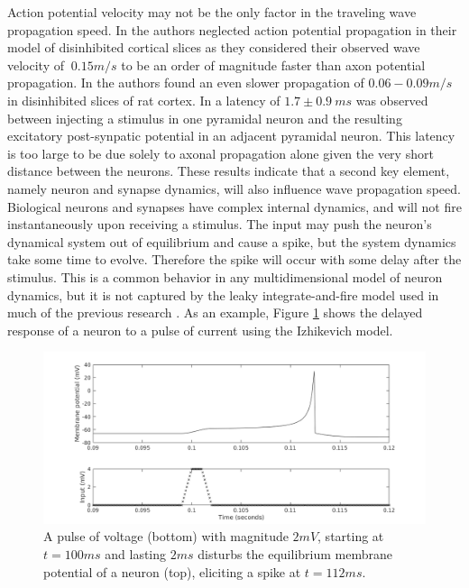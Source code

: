 Action potential velocity may not be the only factor in the traveling wave propagation speed.
In \citet{Golomb1997} the authors neglected action potential propagation in their model of disinhibited cortical slices as they considered their observed wave velocity of $~0.15 m/s$ to be an order of magnitude faster than axon potential propagation.
In \citet{Chervin1988} the authors found an even slower propagation of $0.06-0.09 m/s$ in disinhibited slices of rat cortex.
In  \citet{Markram1997} a latency of $1.7\pm 0.9\ ms$ was observed between injecting a stimulus in one pyramidal neuron and the resulting excitatory post-synpatic potential in an adjacent pyramidal neuron.
This latency is too large to be due solely to axonal propagation alone given the very short distance between the neurons. 
These results indicate that a second key element, namely neuron and synapse dynamics, will also influence wave propagation speed.
Biological neurons and synapses  have complex internal dynamics, and will not fire instantaneously upon receiving a stimulus.
The input may push the neuron's dynamical system out of equilibrium and cause a spike, but the system dynamics take some time to evolve.
Therefore the spike will occur with some delay after the stimulus.
This is a common behavior in any multidimensional model of neuron dynamics, but it is not captured by the leaky integrate-and-fire model used in much of the previous research \citet{keane2015}\citet{Senk2020}.
As an example, Figure \ref{fig:delay_neuronstep} shows the delayed response of a neuron to a pulse of current using the Izhikevich model.
\begin{figure}[!htb]
 \centering
   \includegraphics[width=\textwidth]{fig/WaveSpeed_NeuronStepTest}
   \caption{ A pulse of voltage (bottom) with magnitude $2 mV$, starting at $t=100 ms$ and lasting $2 ms$ disturbs the equilibrium membrane potential of a neuron (top), eliciting a spike at $t=112 ms$. }
   \label{fig:delay_neuronstep}
\end{figure}

